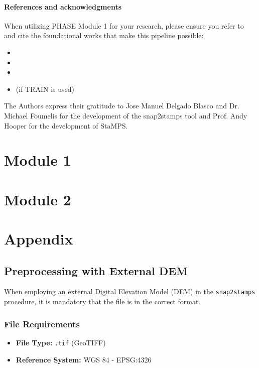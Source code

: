 \documentclass[a4paper,12pt]{report}
\begin{document}
\subsection*{References and acknowledgments}
\noindent When utilizing PHASE Module 1 for your research, please ensure you refer to and cite the foundational works that make this pipeline possible:
\begin{itemize}
    \item {}
    \item {}
    \item {}
    \item (if TRAIN is used) 
\end{itemize}

\vspace{\baselineskip}
\noindent The Authors express their gratitude to Jose Manuel Delgado Blasco and Dr. Michael Foumelis for the development of the snap2stamps tool and Prof. Andy Hooper for the development of StaMPS.

\part{Module 1}



\part{Module 2}



\part{Appendix}
\appendix
\chapter{Preprocessing with External DEM}

When employing an external Digital Elevation Model (DEM) in the \texttt{snap2stamps} procedure, it is mandatory that the file is in the correct format.

\section{File Requirements}
\begin{itemize}
    \item \textbf{File Type:} \texttt{.tif} (GeoTIFF)
    \item \textbf{Reference System:} WGS 84 - EPSG:4326
\end{itemize}
\end{document}
